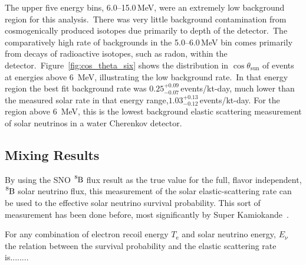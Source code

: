 The upper five energy bins, \numrange[range-phrase=--]{6.0}{15.0}\,MeV, were an
extremely low background region for this analysis.\
There was very little background contamination from
cosmogenically produced isotopes due primarily to depth of the detector.\
The comparatively high rate of backgrounds in the \numrange[range-phrase=--]{5.0}{6.0}\,MeV bin
comes primarily from decays of radioactive isotopes, such as radon, within the detector.\
Figure~\ref{fig:cos_theta_six} shows the distribution in $\cos\theta_\text{{sun}}$ of events at
energies above 6~MeV, illustrating the low background rate.\
In that energy region the best fit background rate was $0.25^{+0.09}_{-0.07}$\,events/kt-day, much
lower than the measured solar rate in that energy range,$1.03^{+0.13}_{-0.12}$\,events/kt-day.
For the region above 6~MeV, this is the lowest
background elastic scattering measurement of solar neutrinos in a water
Cherenkov detector.\

\subsection{Mixing Results}
By using the SNO $\ce{^{8}B}$ flux result as the true value for the full,
flavor independent, $\ce{^{8}B}$ solar neutrino flux, this measurement of the
solar elastic-scattering rate can be used to the effective solar neutrino survival
probability.
This sort of measurement has been done before, most significantly by
Super Kamiokande~\cite{superk1,superk2,superk3,superk4}.

For any combination of electron recoil energy $T_{\mathrm{e}}$ and solar
neutrino energy, $E_{\nu}$ the relation between the survival probability
and the elastic scattering rate is........
